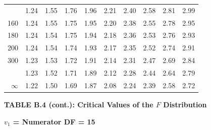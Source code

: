 \documentclass[10pt]{article}
\begin{document}
\begin{longtable}{@{}r!{\vrule width 0.8pt\hspace{0.55em}}rrrrrrrrr@{}}
 & 1.24 & 1.55 & 1.76 & 1.96 & 2.21 & 2.40 & 2.58 & 2.81 & 2.99 \\
160 & 1.24 & 1.55 & 1.75 & 1.95 & 2.20 & 2.38 & 2.55 & 2.78 & 2.95 \\
180 & 1.24 & 1.54 & 1.75 & 1.94 & 2.18 & 2.36 & 2.53 & 2.76 & 2.93 \\
200 & 1.24 & 1.54 & 1.74 & 1.93 & 2.17 & 2.35 & 2.52 & 2.74 & 2.91 \\
300 & 1.23 & 1.53 & 1.72 & 1.91 & 2.14 & 2.31 & 2.47 & 2.69 & 2.84 \\
 & 1.23 & 1.52 & 1.71 & 1.89 & 2.12 & 2.28 & 2.44 & 2.64 & 2.79 \\
$\infty$ & 1.22 & 1.50 & 1.69 & 1.87 & 2.08 & 2.24 & 2.39 & 2.58 & 2.72 \\
\end{longtable}
\newpage
\thispagestyle{empty}
\begin{center}
{\large\bfseries TABLE B.4 (cont.): Critical Values of the $F$ Distribution\par}
\end{center}
{\large\bfseries $v_1$ = Numerator DF = 15\par}
\vspace{0.5em}
\small
\end{document}
